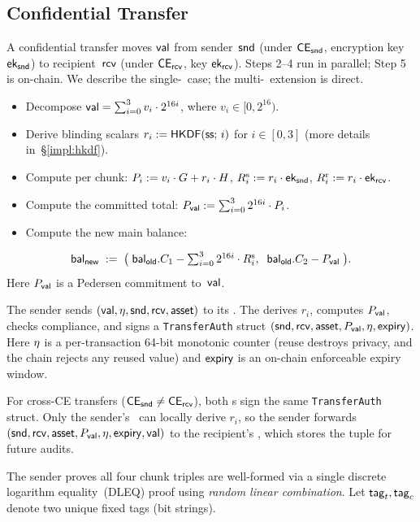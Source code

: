 \subsection{Confidential Transfer}
\label{sec:transfer}
%
A confidential transfer moves $\mathsf{val}$ from sender~${\sf snd}$ (under $\mathsf{CE}_{\sf snd}$, encryption key $\textsf{ek}_{\mathsf{snd}}$) to recipient~${\sf rcv}$ (under $\mathsf{CE}_{\sf rcv}$, key $\textsf{ek}_{\mathsf{rcv}}$).
Steps 2--4 run in parallel; Step 5 is on-chain.
We describe the single-\CE\ case; the multi-\CE\ extension is direct.

\one
{}
%
\begin{itemize}[itemsep=.5pt]
    \item Decompose $\mathsf{val} = \sum_{i=0}^{3} v_i \cdot 2^{16i}$, where $v_i \in [0, 2^{16})$.
    \item Derive blinding scalars $r_i := \mathsf{HKDF}(\mathsf{ss};\, i)$ for $i \in [0,3]$ (more details in~\S\ref{impl:hkdf}).
    \item Compute per chunk: $P_{i} := v_i \cdot G + r_i \cdot H$, $R^{\rm s}_{i} := r_i \cdot \textsf{ek}_{\mathsf{snd}}$, $R^{\rm r}_{i} := r_i \cdot \textsf{ek}_{\mathsf{rcv}}$.
    \item Compute the committed total: $P_\mathsf{val} := \sum_{i=0}^{3} 2^{16i} \cdot P_{i}$.
    \item Compute the new main balance:
\end{itemize}
%
\begin{equation}\label{eq:bal-new}
  \mathsf{bal}_{\mathsf{new}} \;:=\; \bigl(\;\mathsf{bal}_{\mathsf{old}}.C_1 - \textstyle\sum_{i=0}^{3} 2^{16i} \cdot R^{\rm s}_{i},\;\;\mathsf{bal}_{\mathsf{old}}.C_2 - P_\mathsf{val}\;\bigr).
\end{equation}
%
Here $P_\mathsf{val}$ is a Pedersen commitment to~$\mathsf{val}$.

\one
{}
The sender sends $(\mathsf{val}, \eta, {\sf snd}, {\sf rcv}, \mathsf{asset})$ to its \CE.
The \CE derives $r_i$, computes $P_\mathsf{val}$, checks compliance, and signs a \texttt{TransferAuth} struct $({\sf snd}, {\sf rcv}, \mathsf{asset}, P_\mathsf{val}, \eta, \mathsf{expiry})$.
Here $\eta$ is a per-transaction 64-bit monotonic counter (reuse destroys privacy, and the chain rejects any reused value) and $\mathsf{expiry}$ is an on-chain enforceable expiry window.

For cross-CE transfers ($\mathsf{CE}_{\sf snd} \neq \mathsf{CE}_{\sf rcv}$), both \CE s sign the same \texttt{TransferAuth} struct.
Only the sender's \CE\ can locally derive $r_i$, so the sender forwards $({\sf snd}, {\sf rcv}, \mathsf{asset}, P_\mathsf{val}, \eta, \mathsf{expiry}, \mathsf{val})$ to the recipient's \CE, which stores the tuple for future audits.

\one
{}
The sender proves all four chunk triples are well-formed via a single discrete logarithm equality~(DLEQ) proof using \emph{random linear combination}.
Let $\mathsf{tag}_t, \mathsf{tag}_c$ denote two unique fixed tags (bit strings).

